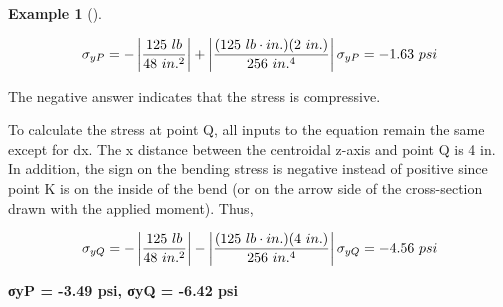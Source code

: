 \documentclass[
  letterpaper,
  DIV=11,
  numbers=noendperiod]{scrreprt}
\theoremstyle{definition}
\newtheorem{example}{Example}[chapter]
\theoremstyle{remark}
\begin{document}
\begin{tcolorbox}
\begin{example}[]
\begin{tcolorbox}
\[
\sigma_{yP}=-\left|\frac{125{~lb}}{48{~in.^2}}\right|+\left|\frac{(125{~lb}\cdot{in.})(2{~in.})}{256{~in.^4}}\right| \\
\sigma_{yP}=-1.63{~psi}
\]

The negative answer indicates that the stress is compressive.

To calculate the stress at point Q, all inputs to the equation remain
the same except for dx. The x distance between the centroidal z-axis and
point Q is 4 in. In addition, the sign on the bending stress is negative
instead of positive since point K is on the inside of the bend (or on
the arrow side of the cross-section drawn with the applied moment).
Thus,

\[
\sigma_{yQ}=-\left|\frac{125{~lb}}{48{~in.^2}}\right|-\left|\frac{(125{~lb}\cdot{in.})(4{~in.})}{256{~in.^4}}\right| \\
\sigma_{yQ}=-4.56{~psi}
\]

\textbf{σyP = -3.49 psi, σyQ = -6.42 psi}

\end{tcolorbox}

\end{example}

\end{tcolorbox}
\end{document}
